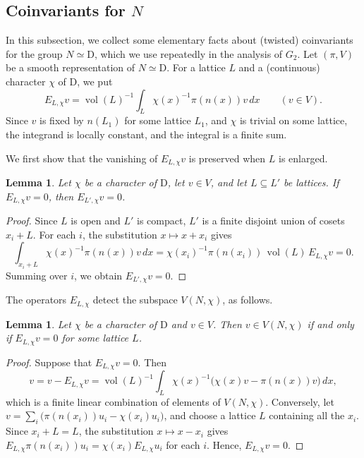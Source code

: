 \documentclass[11pt]{amsart}
\numberwithin{equation}{section}
\theoremstyle{plain}
\newtheorem{lemma}[theorem]{Lemma}
\theoremstyle{definition}
\theoremstyle{remark}
\DeclareMathOperator{\vol}{vol}
\begin{document}
\subsection{Coinvariants for \texorpdfstring{$N$}{N}}\label{ss:coinvariants}

In this subsection, we collect some elementary facts about (twisted) coinvariants for the group $N\simeq\mathrm{D}$, which we use repeatedly in the analysis of $G_2$. Let $(\pi,V)$ be a smooth representation of $N\simeq \mathrm{D}$. For a lattice $L$ and a (continuous) character $\chi$ of $\mathrm{D}$, we put
$$E_{L,\chi}v=\vol(L)^{-1}\int_L\chi(x)^{-1}\pi(n(x))v\,dx\qquad(v\in V).$$
Since $v$ is fixed by $n(L_1)$ for some lattice $L_1$, and $\chi$ is trivial on some lattice, the integrand is locally constant, and the integral is a finite sum.

We first show that the vanishing of $E_{L,\chi}v$ is preserved when $L$ is enlarged.

\begin{lemma}\label{lem:coinv-enlarge}
	Let $\chi$ be a character of $\mathrm{D}$, let $v\in V$, and let $L\subseteq L'$ be lattices. If $E_{L,\chi}v=0$, then $E_{L',\chi}v=0$.
\end{lemma}

\begin{proof}
	Since $L$ is open and $L'$ is compact, $L'$ is a finite disjoint union of cosets $x_i+L$. For each $i$, the substitution $x\mapsto x+x_i$ gives
	$$\int_{x_i+L}\chi(x)^{-1}\pi(n(x))v\,dx=\chi(x_i)^{-1}\pi(n(x_i))\,\vol(L)\,E_{L,\chi}v=0.$$
	Summing over $i$, we obtain $E_{L',\chi}v=0$.
\end{proof}

The operators $E_{L,\chi}$ detect the subspace $V(N,\chi)$, as follows.

\begin{lemma}\label{lem:coinv-kernel}
	Let $\chi$ be a character of $\mathrm{D}$ and $v\in V$. Then $v\in V(N,\chi)$ if and only if $E_{L,\chi}v=0$ for some lattice $L$.
\end{lemma}

\begin{proof}
	Suppose that $E_{L,\chi}v=0$. Then
	$$v=v-E_{L,\chi}v=\vol(L)^{-1}\int_L\chi(x)^{-1}\big(\chi(x)v-\pi(n(x))v\big)\,dx,$$
	which is a finite linear combination of elements of $V(N,\chi)$. Conversely, let $v=\sum_i\big(\pi(n(x_i))u_i-\chi(x_i)u_i\big)$, and choose a lattice $L$ containing all the $x_i$. Since $x_i+L=L$, the substitution $x\mapsto x-x_i$ gives $E_{L,\chi}\pi(n(x_i))u_i=\chi(x_i)E_{L,\chi}u_i$ for each $i$. Hence, $E_{L,\chi}v=0$.
\end{proof}
\end{document}
